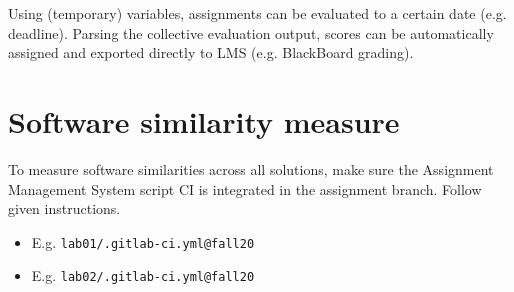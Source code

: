 {Using (temporary) variables, assignments can be evaluated to a certain date (e.g. deadline). Parsing the collective evaluation output, scores can be automatically assigned and exported directly to LMS (e.g. BlackBoard grading).}

\section{Software similarity measure} \label{ssec:softwaresim}

{To measure software similarities across all solutions, make sure the Assignment Management System script CI is integrated in the assignment branch. Follow given instructions.}

\begin{itemize}
\item
  {E.g. \texttt{lab01/.gitlab-ci.yml@fall20}}
\item
  {E.g. \texttt{lab02/.gitlab-ci.yml@fall20}}
\end{itemize}

